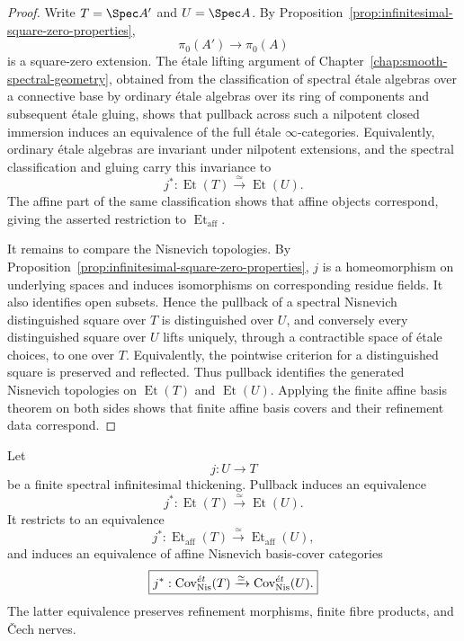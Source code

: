 \begin{proof}
Write $T=\Spec A'$ and $U=\Spec A$.  By
Proposition~\ref{prop:infinitesimal-square-zero-properties},
\[
    \pi_0(A')\longrightarrow\pi_0(A)
\]
is a square-zero extension.  The \'etale lifting argument of
Chapter~\ref{chap:smooth-spectral-geometry}, obtained from the classification
of spectral \'etale algebras over a connective base by ordinary \'etale
algebras over its ring of components and subsequent \'etale gluing, shows
that pullback across such a nilpotent closed immersion induces an equivalence
of the full \'etale $\infty$-categories.  Equivalently, ordinary \'etale
algebras are invariant under nilpotent extensions, and the spectral
classification and gluing carry this invariance to
\[
    j^*:\operatorname{Et}(T)\xrightarrow{\simeq}\operatorname{Et}(U).
\]
The affine part of the same classification shows that affine objects
correspond, giving the asserted restriction to
$\operatorname{Et}_{\mathrm{aff}}$.

It remains to compare the Nisnevich topologies.  By
Proposition~\ref{prop:infinitesimal-square-zero-properties}, $j$ is a
homeomorphism on underlying spaces and induces isomorphisms on corresponding
residue fields.  It also identifies open subsets.  Hence the pullback of a
spectral Nisnevich distinguished square over $T$ is distinguished over $U$,
and conversely every distinguished square over $U$ lifts uniquely, through a
contractible space of \'etale choices, to one over $T$.  Equivalently, the
pointwise criterion for a distinguished square is preserved and reflected.
Thus pullback identifies the generated Nisnevich topologies on
$\operatorname{Et}(T)$ and $\operatorname{Et}(U)$.  Applying the finite
affine basis theorem on both sides shows that finite affine basis covers and
their refinement data correspond.
\end{proof}

\begin{theorem}
\label{thm:infinitesimal-finite-etale-rigidity}
Let
\[
    j:U\longrightarrow T
\]
be a finite spectral infinitesimal thickening.  Pullback induces an
equivalence
\[
    \boxed{
    j^*:\operatorname{Et}(T)
    \xrightarrow{\simeq}
    \operatorname{Et}(U).
    }
\]
It restricts to an equivalence
\[
    j^*:\operatorname{Et}_{\mathrm{aff}}(T)
    \xrightarrow{\simeq}
    \operatorname{Et}_{\mathrm{aff}}(U),
\]
and induces an equivalence of affine Nisnevich basis-cover categories
\[
    \boxed{
    j^*:
    \operatorname{Cov}^{\acute et}_{\mathrm{Nis}}(T)
    \xrightarrow{\simeq}
    \operatorname{Cov}^{\acute et}_{\mathrm{Nis}}(U).
    }
\]
The latter equivalence preserves refinement morphisms, finite fibre products,
and \v{C}ech nerves.
\end{theorem}

